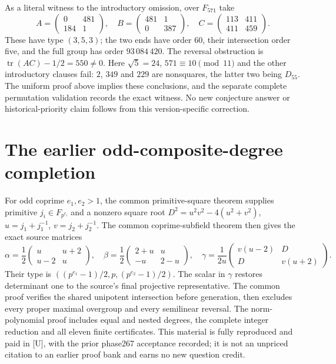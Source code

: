 \documentclass[11pt,a4paper]{article}
\begin{document}
As a literal witness to the introductory omission, over $F_{571}$ take
\[
 A=\begin{pmatrix}0&481\\184&1\end{pmatrix},\quad
 B=\begin{pmatrix}481&1\\0&387\end{pmatrix},\quad
 C=\begin{pmatrix}113&411\\411&459\end{pmatrix}.
\]
These have type $(3,5,3)$; the two ends have order $60$, their
intersection order five, and the full group has order $93\,084\,420$.
The reversal obstruction is $\operatorname{tr}(AC)-1/2=550\ne0$.
Here $\sqrt5=24$, $571\equiv10\pmod{11}$ and the other introductory
clauses fail: $2$, $349$ and $229$ are nonsquares, the latter two being
$D_{55}$. The uniform proof above implies these conclusions, and the
separate complete permutation validation records the exact witness.
No new conjecture answer or historical-priority claim follows from this
version-specific correction.

\section{The earlier odd-composite-degree completion}
For odd coprime $e_1,e_2>1$, the common primitive-square theorem supplies
primitive $j_i\in F_{p^{e_i}}$ and a nonzero square root
$D^2=u^2v^2-4(u^2+v^2)$, $u=j_1+j_1^{-1}$, $v=j_2+j_2^{-1}$.
The common coprime-subfield theorem then gives the exact source matrices
\[
 \alpha=\frac12\begin{pmatrix}u&u+2\\u-2&u\end{pmatrix},\quad
 \beta=\frac12\begin{pmatrix}2+u&u\\-u&2-u\end{pmatrix},\quad
 \gamma=\frac1{2u}\begin{pmatrix}v(u-2)&D\\D&v(u+2)\end{pmatrix}.
\]
Their type is $((p^{e_1}-1)/2,p,(p^{e_2}-1)/2)$.
The scalar in $\gamma$ restores determinant one to the source's final
projective representative. The common proof verifies the shared
unipotent intersection before generation, then excludes every proper
maximal overgroup and every semilinear reversal. The norm-polynomial
proof includes equal and nested degrees, the complete integer reduction
and all eleven finite certificates. This material is fully reproduced
and paid in [U], with the prior phase267 acceptance recorded; it is not
an unpriced citation to an earlier proof bank and earns no new question credit.
\end{document}
